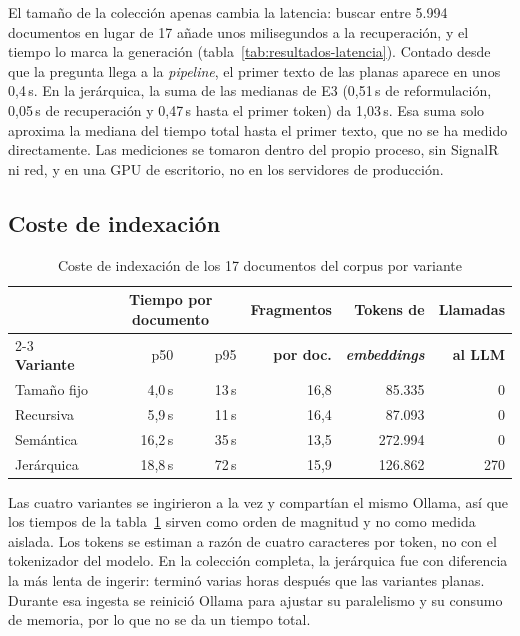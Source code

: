 El tamaño de la colección apenas cambia la latencia: buscar entre 5.994 documentos en lugar de 17 añade unos milisegundos a la recuperación, y el tiempo lo marca la generación (tabla~\ref{tab:resultados-latencia}). Contado desde que la pregunta llega a la \emph{pipeline}, el primer texto de las planas aparece en unos 0,4\,s. En la jerárquica, la suma de las medianas de E3 (0,51\,s de reformulación, 0,05\,s de recuperación y 0,47\,s hasta el primer token) da 1,03\,s. Esa suma solo aproxima la mediana del tiempo total hasta el primer texto, que no se ha medido directamente. Las mediciones se tomaron dentro del propio proceso, sin SignalR ni red, y en una GPU de escritorio, no en los servidores de producción.

\subsection{Coste de indexación}

\begin{table}[htbp]
\centering\small
\caption{Coste de indexación de los 17 documentos del corpus por variante}
\label{tab:resultados-indexacion}
\begin{tabular}{@{}l rr r r r@{}}
\toprule
& \multicolumn{2}{c}{\textbf{Tiempo por documento}} & \textbf{Fragmentos} & \textbf{Tokens de} & \textbf{Llamadas} \\
\cmidrule(lr){2-3}
\textbf{Variante} & p50 & p95 & \textbf{por doc.} & \textbf{\emph{embeddings}} & \textbf{al LLM} \\
\midrule
Tamaño fijo & 4,0\,s & 13\,s & 16,8 & 85.335 & 0 \\
Recursiva   & 5,9\,s & 11\,s & 16,4 & 87.093 & 0 \\
Semántica   & 16,2\,s & 35\,s & 13,5 & 272.994 & 0 \\
Jerárquica  & 18,8\,s & 72\,s & 15,9 & 126.862 & 270 \\
\bottomrule
\end{tabular}
\end{table}

Las cuatro variantes se ingirieron a la vez y compartían el mismo Ollama, así que los tiempos de la tabla~\ref{tab:resultados-indexacion} sirven como orden de magnitud y no como medida aislada. Los tokens se estiman a razón de cuatro caracteres por token, no con el tokenizador del modelo. En la colección completa, la jerárquica fue con diferencia la más lenta de ingerir: terminó varias horas después que las variantes planas. Durante esa ingesta se reinició Ollama para ajustar su paralelismo y su consumo de memoria, por lo que no se da un tiempo total.

